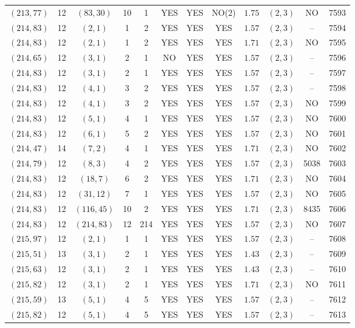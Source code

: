 \begin{longtable}{|c|c|c|c|c|c|c|c|c|c|c|c|}
$(213,77)$ & 12 & $(83,30)$ & 10 & 1 & YES & YES & NO(2) & $1.75$ & $(2,3)$ & NO & 7593\\
$(214,83)$ & 12 & $(2,1)$ & 1 & 2 & YES & YES & YES & $1.57$ & $(2,3)$ & -- & 7594\\
$(214,83)$ & 12 & $(2,1)$ & 1 & 2 & YES & YES & YES & $1.71$ & $(2,3)$ & NO & 7595\\
$(214,65)$ & 12 & $(3,1)$ & 2 & 1 & NO & YES & YES & $1.57$ & $(2,3)$ & -- & 7596\\
$(214,83)$ & 12 & $(3,1)$ & 2 & 1 & YES & YES & YES & $1.57$ & $(2,3)$ & -- & 7597\\
$(214,83)$ & 12 & $(4,1)$ & 3 & 2 & YES & YES & YES & $1.57$ & $(2,3)$ & -- & 7598\\
$(214,83)$ & 12 & $(4,1)$ & 3 & 2 & YES & YES & YES & $1.57$ & $(2,3)$ & NO & 7599\\
$(214,83)$ & 12 & $(5,1)$ & 4 & 1 & YES & YES & YES & $1.57$ & $(2,3)$ & NO & 7600\\
$(214,83)$ & 12 & $(6,1)$ & 5 & 2 & YES & YES & YES & $1.57$ & $(2,3)$ & NO & 7601\\
$(214,47)$ & 14 & $(7,2)$ & 4 & 1 & YES & YES & YES & $1.71$ & $(2,3)$ & NO & 7602\\
$(214,79)$ & 12 & $(8,3)$ & 4 & 2 & YES & YES & YES & $1.57$ & $(2,3)$ & 5038 & 7603\\
$(214,83)$ & 12 & $(18,7)$ & 6 & 2 & YES & YES & YES & $1.71$ & $(2,3)$ & NO & 7604\\
$(214,83)$ & 12 & $(31,12)$ & 7 & 1 & YES & YES & YES & $1.57$ & $(2,3)$ & NO & 7605\\
$(214,83)$ & 12 & $(116,45)$ & 10 & 2 & YES & YES & YES & $1.71$ & $(2,3)$ & 8435 & 7606\\
$(214,83)$ & 12 & $(214,83)$ & 12 & 214 & YES & YES & YES & $1.57$ & $(2,3)$ & NO & 7607\\
$(215,97)$ & 12 & $(2,1)$ & 1 & 1 & YES & YES & YES & $1.57$ & $(2,3)$ & -- & 7608\\
$(215,51)$ & 13 & $(3,1)$ & 2 & 1 & YES & YES & YES & $1.43$ & $(2,3)$ & -- & 7609\\
$(215,63)$ & 12 & $(3,1)$ & 2 & 1 & YES & YES & YES & $1.43$ & $(2,3)$ & -- & 7610\\
$(215,82)$ & 12 & $(3,1)$ & 2 & 1 & YES & YES & YES & $1.71$ & $(2,3)$ & NO & 7611\\
$(215,59)$ & 13 & $(5,1)$ & 4 & 5 & YES & YES & YES & $1.57$ & $(2,3)$ & -- & 7612\\
$(215,82)$ & 12 & $(5,1)$ & 4 & 5 & YES & YES & YES & $1.57$ & $(2,3)$ & -- & 7613\\

\end{longtable}
